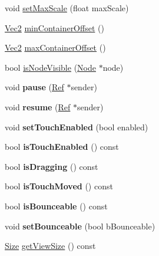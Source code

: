 \begin{DoxyCompactItemize}
\item 
void \hyperlink{classScrollView_a8ec505c49d181c320f88cadbd2be5785}{set\+Max\+Scale} (float max\+Scale)
\item 
\hyperlink{classVec2}{Vec2} \hyperlink{classScrollView_a53daf6cba39b0e1340d66728394c6a41}{min\+Container\+Offset} ()
\item 
\hyperlink{classVec2}{Vec2} \hyperlink{classScrollView_a0c3c4cc77fc7af466bfc3cccd6b1b122}{max\+Container\+Offset} ()
\item 
bool \hyperlink{classScrollView_a0605de8c4ddbb06479cfdb8eee65e41e}{is\+Node\+Visible} (\hyperlink{classNode}{Node} $\ast$node)
\item 
\mbox{\label{classScrollView_a8e0243782ea8fba9fca1909c47b5acca}} 
void {\bfseries pause} (\hyperlink{classRef}{Ref} $\ast$sender)
\item 
\mbox{\label{classScrollView_aecbf33a1806c9416e145b6bdfa34d87f}} 
void {\bfseries resume} (\hyperlink{classRef}{Ref} $\ast$sender)
\item 
\mbox{\label{classScrollView_a5ba7f6eb8537a9bd30b2026227a5631a}} 
void {\bfseries set\+Touch\+Enabled} (bool enabled)
\item 
\mbox{\label{classScrollView_a963d2bacb68ccefbb5dfffcf88a5a7b5}} 
bool {\bfseries is\+Touch\+Enabled} () const
\item 
\mbox{\label{classScrollView_ae9307d50e4ca9ca19731400b6f801363}} 
bool {\bfseries is\+Dragging} () const
\item 
\mbox{\label{classScrollView_aad09fb7b94c104e83ef8b499552aa805}} 
bool {\bfseries is\+Touch\+Moved} () const
\item 
\mbox{\label{classScrollView_ac3086ac241a29eb9ce311043506238e1}} 
bool {\bfseries is\+Bounceable} () const
\item 
\mbox{\label{classScrollView_ad21c34fd7ab0d5e7dfaa4fb5b35e8476}} 
void {\bfseries set\+Bounceable} (bool b\+Bounceable)
\item 
\hyperlink{classSize}{Size} \hyperlink{classScrollView_a84b4e4eb00a0877a2b2e71e3f1792b68}{get\+View\+Size} () const

\end{DoxyCompactItemize}
